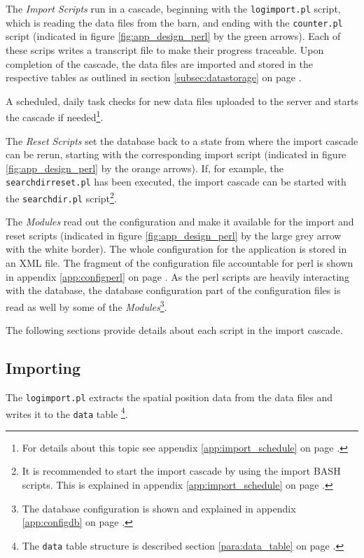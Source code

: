 The \textit{Import Scripts} run in a cascade, beginning with the \lstinline|logimport.pl| script, which is reading the data files from the barn, and ending with the \lstinline|counter.pl| script (indicated in figure \ref{fig:app_design_perl} by the green arrows). Each of these scrips writes a transcript file to make their progress traceable. Upon completion of the cascade, the data files are imported and stored in the respective tables as outlined in section \ref{subsec:datastorage} on page \pageref{subsec:datastorage}.

A scheduled, daily task checks for new data files uploaded to the server and starts the cascade if needed\footnote{For details about this topic see appendix \ref{app:import_schedule} on page \pageref{app:import_schedule}.}.

The \textit{Reset Scripts} set the database back to a state from where the import cascade can be rerun,  starting with the corresponding import script (indicated in figure \ref{fig:app_design_perl} by the orange arrows). If, for example, the \lstinline|searchdirreset.pl| has been executed, the import cascade can be started with the \lstinline|searchdir.pl| script\footnote{It is recommended to start the import cascade by using the import BASH scripts. This is explained in appendix \ref{app:import_schedule} on page \pageref{app:import_schedule}.}.

The \textit{Modules} read out the configuration and make it available for the import and reset scripts (indicated in figure \ref{fig:app_design_perl} by the large grey arrow with the white border). The whole configuration for the application is stored in an XML file. The fragment of the configuration file accountable for perl is shown in appendix \ref{app:configperl} on page \pageref{app:configperl}. As the perl scripts are heavily interacting with the database, the database configuration part of the configuration files is read as well by some of the \textit{Modules}\footnote{The database configuration is shown and explained in appendix \ref{app:configdb} on page \pageref{app:configdb}.}. 

The following sections provide details about each script in the import cascade.

\subsection{Importing}
\label{subsec:importing}

The \lstinline|logimport.pl| extracts the spatial position data from the data files and writes it to the \lstinline|data| table \footnote{The \lstinline|data| table structure is described section \ref{para:data_table} on page \pageref{para:data_table}.}.

